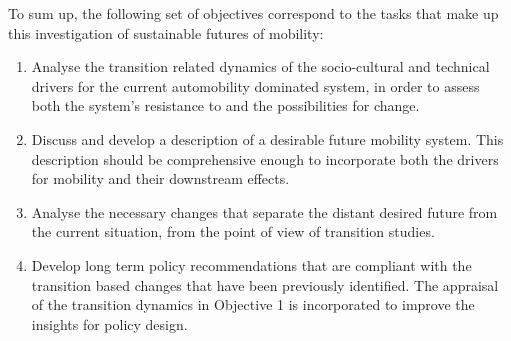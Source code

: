 
To sum up, the following set of objectives correspond to the tasks that make up this investigation of sustainable futures of mobility:
\begin{enumerate}[leftmargin=*,label=\textbf{Obj.~\arabic*.}]
\item\label{obj:1} Analyse the transition related dynamics of the socio-cultural and technical drivers for the current automobility dominated system, in order to assess both the system's resistance to and the possibilities for change.
\item Discuss and develop a description of a desirable future mobility system. This description should be comprehensive enough to incorporate both the drivers for mobility and their downstream effects.
\item Analyse the necessary changes that separate the distant desired future from the current situation, from the point of view of transition studies.
\item Develop long term policy recommendations that are compliant with the transition based changes that have been previously identified. The appraisal of the transition dynamics in Objective 1 is incorporated to improve the insights for policy design.
\end{enumerate}